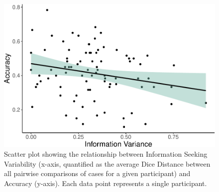 \documentclass[a4paper, nobind]{templates/ociamthesis}
\begin{document}
\begin{figure}[H]

{\centering \includegraphics[width=1\linewidth]{_main_files/figure-latex/accVarPlot-1} 

}

\caption{Scatter plot showing the relationship between Information Seeking Variability (x-axis, quantified as the average Dice Distance between all pairwise comparisons of cases for a given participant) and Accuracy (y-axis). Each data point represents a single participant.}\label{fig:accVarPlot}
\end{figure}

\newpage
\end{document}
